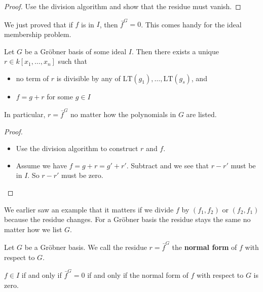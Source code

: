 \documentclass[a4paper, 11pt]{article}
\begin{document}
\begin{proof}
  Use the division algorithm and show that the residue must vanish.
\end{proof}

We just proved that if \( f \) is in \( I \), then \( \bar f^G = 0 \). This comes handy for the ideal membership problem.

\begin{mdframed}
\begin{prop}
  Let \( G \) be a Gröbner basis of some ideal \( I \). Then there exists a unique \( r \in k[x_1,\dots,x_n] \) such that 
  \begin{itemize}
    \item no term of \( r \) is divisible by any of \( \mathrm{LT}(g_1),\dots,\mathrm{LT}(g_s) \), and
    \item \( f = g + r \) for some \( g \in I \)
  \end{itemize}
  In particular, \( r = \bar f^G \) no matter how the polynomials in \( G \) are listed.
\end{prop}
\end{mdframed}



\begin{proof}\(  \)
  \begin{itemize}
    \item Use the division algorithm to construct \( r \) and \( f \).
    \item Assume we have \( f = g + r = g' + r' \). Subtract and we see that \( r-r' \) must be in \( I \). So \( r - r' \) must be zero.
  \end{itemize}
\end{proof}

\begin{remark}
 We earlier saw an example that it matters if we divide \( f \) by \( (f_1,f_2) \) or \( (f_2,f_1) \) because the residue changes. For a Gröbner basis the residue stays the same no matter how we list \( G \).
\end{remark}

\begin{defi}
  Let \( G \) be a Gröbner basis.
  We call the residue \( r= \bar f^G  \) the \textbf{normal form} of \( f \) with respect to \( G \).
\end{defi}

\begin{cor}
  \( f \in I \) if and only if \( \bar f^G = 0 \) if and only if the normal form of \( f \) with respect to \( G \) is zero.
\end{cor}
\end{document}
